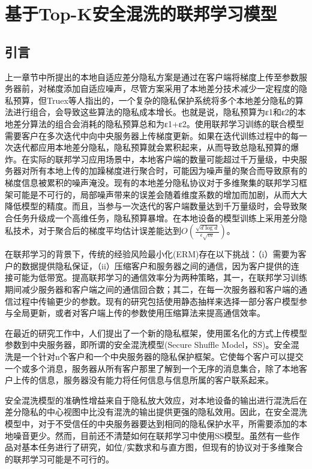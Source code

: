 \chapter{基于Top-K安全混洗的联邦学习模型}
\label{ch4}
\section{引言}
上一章节中所提出的本地自适应差分隐私方案是通过在客户端将梯度上传至参数服务器前，对梯度添加自适应噪声，尽管方案采用了本地差分技术减少一定程度的隐私预算，但Truex等人指出的，一个复杂的隐私保护系统将多个本地差分隐私的算法进行组合，会导致这些算法的隐私成本增长。也就是说，隐私预算为ε1和ε2的本地差分算法的组合会消耗的隐私预算总和为ε1+ε2。使用联邦学习训练的联合模型需要客户在多次迭代中向中央服务器上传梯度更新。如果在迭代训练过程中的每一次迭代都应用本地差分隐私，隐私预算就会累积起来，从而导致总隐私预算的爆炸。在实际的联邦学习应用场景中，本地客户端的数量可能超过千万量级，中央服务器对所有本地上传的加躁梯度进行聚合时，可能因为噪声量的聚合而导致原有的梯度信息被累积的噪声淹没。现有的本地差分隐私协议对于多维聚集的联邦学习框架可能是不可行的，局部噪声带来的误差会随着维度系数的增加而加剧，从而大大降低模型的精度。而且，当参与一次迭代的客户端数量达到千万量级时，会导致聚合任务升级成一个高维任务，隐私预算暴增。在本地设备的模型训练上采用差分隐私技术，对于聚合后的梯度平均估计误差能达到$O\left(\frac{\sqrt{d \log d}}{\epsilon \sqrt{m}}\right)$。

在联邦学习的背景下，传统的经验风险最小化(ERM)存在以下挑战：（i）需要为客户的数据提供隐私保证，（ii）压缩客户和服务器之间的通信，因为客户提供的连接可能为低带宽。提高联邦学习的通信效率分为两种策略，其一，在联邦学习训练期间减少服务器和客户端之间的通信回合数；其二，在每一次服务器和客户端的通信过程中传输更少的参数。现有的研究包括使用静态抽样来选择一部分客户模型参与全局更新，或者对客户端上传的参数使用压缩算法来提高通信效率。

在最近的研究工作中，人们提出了一个新的隐私框架，使用匿名化的方式上传模型参数到中央服务器，即所谓的安全混洗模型(Secure Shuffle Model，SS)。安全混洗是一个针对n个客户和一个中央服务器的隐私保护框架。它使每个客户可以提交一个或多个消息，服务器从所有客户那里了解到一个无序的消息集合，除了本地客户上传的信息，服务器没有能力将任何信息与信息所属的客户联系起来。

安全混洗模型的准确性增益来自于隐私放大效应，对本地设备的输出进行混洗后在差分隐私的中心视图中比没有混洗的输出提供更强的隐私效用。因此，在安全混洗模型中，对于不受信任的中央服务器要达到相同的隐私保护水平，所需要添加的本地噪音更少。然而，目前还不清楚如何在联邦学习中使用SS模型。虽然有一些作品对基本任务进行了研究，如位/实数求和与直方图，但现有的协议对于多维聚合的联邦学习可能是不可行的。

